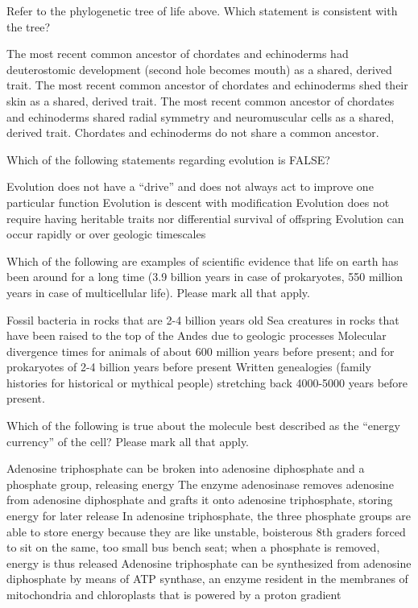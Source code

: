 \documentclass[exam,addpoints,answers]{exam}
\begin{document}
\begin{questions}
\question[1] Refer to the phylogenetic tree of life above. Which statement is consistent with the tree? 
\begin{choices}
\CorrectChoice The most recent common ancestor of chordates and echinoderms had deuterostomic development (second hole becomes mouth) as a shared, derived trait.
\choice The most recent common ancestor of chordates and echinoderms shed their skin as a shared, derived trait.
\choice The most recent common ancestor of chordates and echinoderms shared radial symmetry and neuromuscular cells as a shared, derived trait. 
\choice Chordates and echinoderms do not share a common ancestor. 
\end{choices}


\question[1] Which of the following statements regarding evolution is FALSE?
\begin{choices}
\choice Evolution does not have a ``drive'' and does not always act to improve one particular function
\choice Evolution is descent with modification
\CorrectChoice Evolution does not require having heritable traits nor differential survival of offspring
\choice Evolution can occur rapidly or over geologic timescales
\end{choices}



\question[1] Which of the following are examples of scientific evidence that life on earth has been around for a long time (3.9 billion years in case of prokaryotes, 550 million years in case of multicellular life). Please mark all that apply.
\begin{choices} 
\CorrectChoice Fossil bacteria in rocks that are 2-4 billion years old
\CorrectChoice Sea creatures in rocks that have been raised to the top of the Andes due to geologic processes
\CorrectChoice Molecular divergence times for animals of about 600 million years before present; and for prokaryotes of 2-4 billion years before present
\choice Written genealogies (family histories for historical or mythical people) stretching back 4000-5000 years before present. 
\end{choices}




\question[1] Which of the following is true about the molecule best described as the ``energy currency'' of the cell? Please mark all that apply. 
\begin{choices}
\CorrectChoice Adenosine triphosphate can be broken into adenosine diphosphate and a phosphate group, releasing energy
\choice The enzyme adenosinase removes adenosine from adenosine diphosphate and grafts it onto adenosine triphosphate, storing energy for later release
\CorrectChoice In adenosine triphosphate, the three phosphate groups are able to store energy because they are like unstable, boisterous 8th graders forced to sit on the same, too small bus bench seat; when a phosphate is removed, energy is thus released
\CorrectChoice Adenosine triphosphate can be synthesized from adenosine diphosphate by means of ATP synthase, an enzyme resident in the membranes of mitochondria and chloroplasts that is powered by a proton gradient
\end{choices}




\end{questions}
\end{document}
